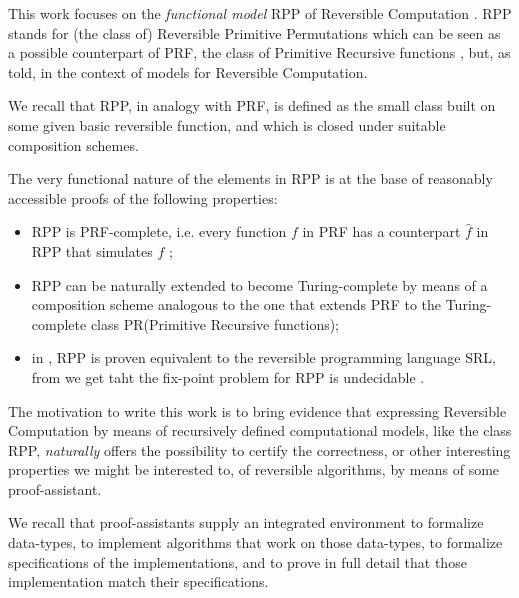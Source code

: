 \documentclass[runningheads]{llncs}
\newcommand{\RPP}{\textsf{RPP}\xspace}
\newcommand{\PRF}{\textsf{PRF}\xspace}
\newcommand{\PR}{\textsf{PR}\xspace}
\newcommand{\SRL}{\textsf{SRL}\xspace}
\begin{document}
This work focuses on the \emph{functional model} \RPP of Reversible Computation \cite{PAOLINI2020218}.
\RPP stands for (the class of) Reversible Primitive Permutations which can be seen as a possible counterpart of \PRF, the class of Primitive Recursive functions \cite{rogers1967theory,soare1987book}, but, as told, in the context of models for Reversible Computation.

We recall that \RPP, in analogy with \PRF, is defined as the small class built on some given basic reversible function,
and which is closed under suitable composition schemes.

The very functional nature of the elements in \RPP is at the base of reasonably accessible proofs of the following properties:
\begin{itemize}
\item \RPP is \PRF-complete, i.e. every function $ f $ in \PRF has a counterpart $ \hat{f} $ in \RPP that simulates $ f $ \cite{DBLP:journals/tcs/PaoliniPR20};

\item \RPP can be naturally extended to become Turing-complete \cite{Paolini2018NGC} by means of a composition scheme analogous to the one that extends \PRF to the Turing-complete class \PR (Primitive Recursive functions);

\item in \cite{MatosRC2020}, \RPP is proven equivalent  to the reversible programming language \SRL \cite{matos03tcs}, from we get taht the fix-point problem for \RPP is undecidable \cite{2318_1734164MatosPaoliniRoversiTCSICTCS18}.
\end{itemize}

The motivation to write this work is to bring evidence that expressing Reversible Computation by means of recursively defined computational models, like the class \RPP, \emph{naturally} offers the possibility to certify the correctness, or other interesting properties we might be interested to, of reversible algorithms, by means of some proof-assistant.

We recall that proof-assistants supply an integrated environment to formalize data-types, to implement algorithms that work on those data-types, to formalize specifications of the implementations, and to prove in full detail that those implementation match their specifications.

\end{document}
